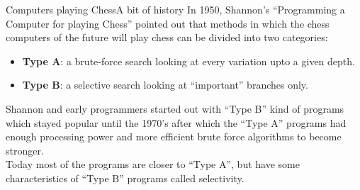 \documentclass[9pt, unknownkeysallowed]{beamer}
\begin{document}
\begin{frame}{Computers playing Chess}{A bit of history}
 In 1950, Shannon's ``Programming a Computer for playing Chess'' pointed out that methods in which the chess computers of the future will play chess can be divided into two categories:
 \begin{itemize}
  \item \textbf{Type A}: a brute-force search looking at every variation upto a given depth.
  \item \textbf{Type B}: a selective search looking at ``important'' branches only.
 \end{itemize}
 Shannon and early programmers started out with ``Type B'' kind of programs which stayed popular until the 1970's after which the ``Type A'' programs had enough processing power and more efficient brute force algorithms to become stronger.\\
 Today most of the programs are closer to ``Type A'', but have some characteristics of ``Type B'' programs called selectivity.
\end{frame}
\end{document}
